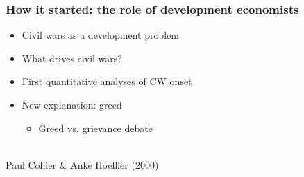 \documentclass[utf8, xcolor=dvipsnames]{beamer}
\begin{document}
\begin{frame}
\frametitle{How it started: the role of development economists}
\centering

\begin{minipage}{0.5\textwidth}\centering
\begin{itemize}
  \item Civil wars as a development problem
  \item What drives civil wars?
  \item First quantitative analyses of CW onset
  \item New explanation: greed
  \begin{itemize}
    \item Greed vs. grievance debate
  \end{itemize}
\end{itemize}
\end{minipage}\hfill
\begin{minipage}{0.5\textwidth}\centering
{}\\
{\small Paul Collier \& Anke Hoeffler (2000)}
\end{minipage}

\end{frame}
\end{document}

